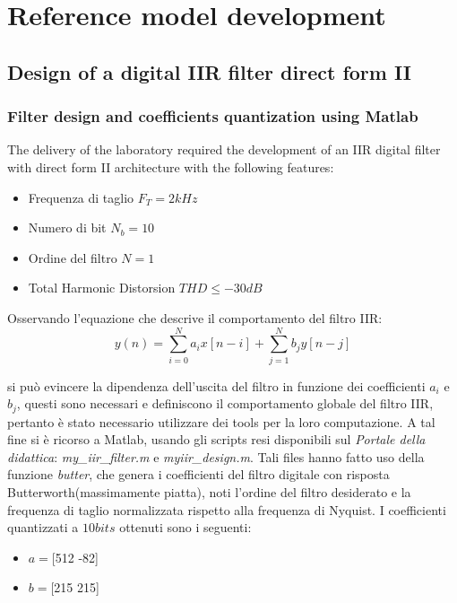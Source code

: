 \section{Reference model development}
\subsection{Design of a digital IIR filter direct form II}

\subsubsection{Filter design and coefficients quantization using Matlab}
The delivery of the laboratory required the development of an IIR digital filter with direct form II architecture with the following features:
\begin{itemize}
\item Frequenza di taglio $F_{T} = 2 kHz$
\item Numero di bit $N_{b} = 10$
\item Ordine del filtro $N = 1$
\item Total Harmonic Distorsion $THD \leq -30 dB$
\end{itemize}

Osservando l'equazione che descrive il comportamento del filtro IIR:
\begin{equation}
y(n) = \sum_{i=0}^N a_{i}x[n-i]  + \sum_{j=1}^N b_{j}y[n-j]
\end{equation}

si può evincere la dipendenza dell'uscita del filtro in funzione dei coefficienti $a_{i}$ e $b_{j}$, questi sono necessari e definiscono il comportamento globale del filtro IIR, pertanto è stato necessario utilizzare dei tools per la loro computazione. A tal fine si è ricorso a Matlab, usando gli scripts resi disponibili sul \textit{Portale della didattica}: \textit{my\_iir\_filter.m} e \textit{myiir\_design.m}. Tali files hanno fatto uso della funzione \textit{butter}, che genera i coefficienti del filtro digitale con risposta Butterworth(massimamente piatta), noti l'ordine del filtro desiderato e la frequenza di taglio normalizzata rispetto alla frequenza di Nyquist. I coefficienti quantizzati a $10 bits$ ottenuti sono i seguenti:

\begin{itemize}
\item $a = $[512 -82]
\item $b = $[215 215]
\end{itemize}

